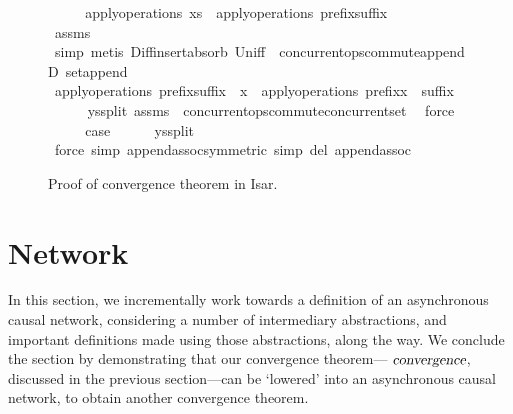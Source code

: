 \documentclass[acmlarge,review,anonymous]{acmart}\settopmatter{printfolios=true}
\begin{document}
\begin{figure}[t]
\begin{isabellebody}
\ \ \isamarkupfalse%
\ \isamarkupfalse%
\ {\isachardoublequoteopen}apply{\isacharunderscore}operations\ xs\ {\isacharequal}\ apply{\isacharunderscore}operations\ {\isacharparenleft}prefix{\isacharat}suffix{\isacharparenright}{\isachardoublequoteclose}\isanewline
\ \ \ \ \isamarkupfalse%
\ assms\ \isamarkupfalse%
\ simp\ {\isacharparenleft}metis\ Diff{\isacharunderscore}insert{\isacharunderscore}absorb\ Un{\isacharunderscore}iff\ {\isacharasterisk}\ concurrent{\isacharunderscore}ops{\isacharunderscore}commute{\isacharunderscore}appendD\ set{\isacharunderscore}append{\isacharparenright}\isanewline
\ \ \isamarkupfalse%
\ \isamarkupfalse%
\ {\isachardoublequoteopen}apply{\isacharunderscore}operations\ {\isacharparenleft}prefix{\isacharat}suffix\ {\isacharat}\ {\isacharbrackleft}x{\isacharbrackright}{\isacharparenright}\ {\isacharequal}\ apply{\isacharunderscore}operations\ {\isacharparenleft}prefix{\isacharat}x\ {\isacharhash}\ suffix{\isacharparenright}{\isachardoublequoteclose}\isanewline
\ \ \ \ \isamarkupfalse%
\ ys{\isacharunderscore}split\ assms\ {\isacharasterisk}{\isacharasterisk}\ concurrent{\isacharunderscore}ops{\isacharunderscore}commute{\isacharunderscore}concurrent{\isacharunderscore}set\ \isamarkupfalse%
\ force\isanewline
\ \ \isamarkupfalse%
\ \isamarkupfalse%
\ {\isacharquery}case\isanewline
\ \ \ \ \isamarkupfalse%
\ ys{\isacharunderscore}split\ \isamarkupfalse%
\ {\isacharparenleft}force\ simp{\isacharcolon}\ append{\isacharunderscore}assoc{\isacharbrackleft}symmetric{\isacharbrackright}\ simp\ del{\isacharcolon}\ append{\isacharunderscore}assoc{\isacharparenright}\isanewline
{}\isamarkupfalse%
  \end{isabellebody}
  \caption{Proof of convergence theorem in Isar.}
  \label{fig.convergence}
\end{figure}



\section{Network}
\label{sect.network}

In this section, we incrementally work towards a definition of an asynchronous causal network, considering a number of intermediary abstractions, and important definitions made using those abstractions, along the way.
We conclude the section by demonstrating that our convergence theorem---$\isa{convergence}$, discussed in the previous section---can be `lowered' into an asynchronous causal network, to obtain another convergence theorem.
\end{document}

